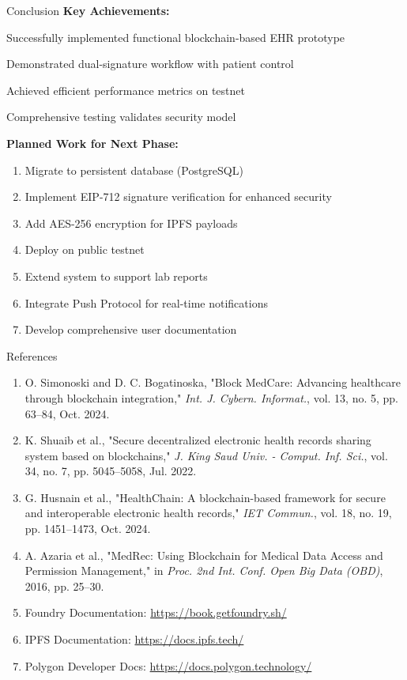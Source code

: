 \documentclass[10pt]{beamer}
\let\olditemize\itemize
\let\endolditemize\enditemize
\renewenvironment{itemize}
  {\olditemize\justifying}
  {\endolditemize}
\begin{document}
\begin{frame}{Conclusion}
\textbf{Key Achievements:}
\begin{itemize}
\item Successfully implemented functional blockchain-based EHR prototype
\item Demonstrated dual-signature workflow with patient control
\item Achieved efficient performance metrics on testnet
\item Comprehensive testing validates security model
\end{itemize}

\vspace{0.5cm}
\textbf{Planned Work for Next Phase:}
\begin{enumerate}
\item Migrate to persistent database (PostgreSQL)
\item Implement EIP-712 signature verification for enhanced security
\item Add AES-256 encryption for IPFS payloads
\item Deploy on public testnet
\item Extend system to support lab reports
\item Integrate Push Protocol for real-time notifications
\item Develop comprehensive user documentation
\end{enumerate}
\end{frame}

\begin{frame}{References}
\footnotesize
\begin{enumerate}
\item O. Simonoski and D. C. Bogatinoska, "Block MedCare: Advancing healthcare through blockchain integration," \textit{Int. J. Cybern. Informat.}, vol. 13, no. 5, pp. 63--84, Oct. 2024.

\item K. Shuaib et al., "Secure decentralized electronic health records sharing system based on blockchains," \textit{J. King Saud Univ. - Comput. Inf. Sci.}, vol. 34, no. 7, pp. 5045--5058, Jul. 2022.

\item G. Husnain et al., "HealthChain: A blockchain-based framework for secure and interoperable electronic health records," \textit{IET Commun.}, vol. 18, no. 19, pp. 1451--1473, Oct. 2024.


\item A. Azaria et al., "MedRec: Using Blockchain for Medical Data Access and Permission Management," in \textit{Proc. 2nd Int. Conf. Open Big Data (OBD)}, 2016, pp. 25--30.

\item Foundry Documentation: \url{https://book.getfoundry.sh/}

\item IPFS Documentation: \url{https://docs.ipfs.tech/}

\item Polygon Developer Docs: \url{https://docs.polygon.technology/}
\end{enumerate}
\end{frame}
\end{document}
